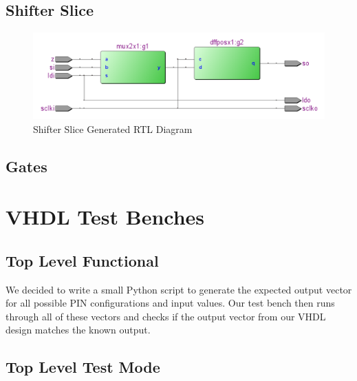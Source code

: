 \documentclass{article}
\begin{document}
    \subsection{Shifter Slice}
        
        \begin{figure}[H]
            \centering
            \includegraphics[width=\linewidth]{../../doc/rtl_pics/shift_slice_rtl.png}
            \caption{Shifter Slice Generated RTL Diagram}
        \end{figure}
    \newpage
    \subsection{Gates}
        
        
        
        

\section{VHDL Test Benches}
    \subsection{Top Level Functional}
        
        We decided to write a small Python script to generate the expected
        output vector for all possible PIN configurations and input values. Our
        test bench then runs through all of these vectors and checks if the
        output vector from our VHDL design matches the known output.
        
    \newpage
    \subsection{Top Level Test Mode}
        
\end{document}
